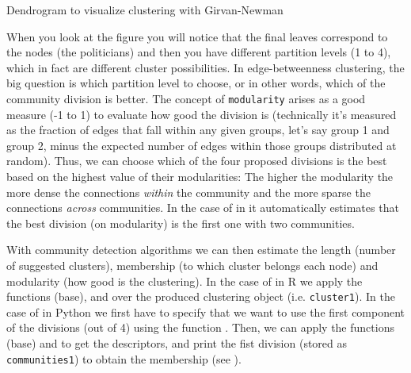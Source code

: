 \begin{ccsexample}
  \caption{Dendrogram to visualize clustering with Girvan-Newman}
  \label{ex:girvan}
\end{ccsexample}



When you look at the figure you will notice that the final leaves correspond to the nodes (the politicians) and then you have different partition levels (1 to 4), which in fact are different cluster possibilities. In edge-betweenness clustering, the big question is which partition level to choose, or in other words, which of the community division is better. The concept of \texttt{modularity} arises as a good measure (-1 to 1) to evaluate how good the division is (technically it's measured as the fraction of edges that fall within any given groups, let's say group 1 and group 2, minus the expected number of edges within those groups distributed at random). Thus, we can choose which of the four proposed divisions is the best based on the highest value of their modularities: The higher the modularity the more dense the connections \textit{within} the community and the more sparse the connections \textit{across} communities. In the case of  in  it automatically estimates that the best division (on modularity) is the first one with two communities.

With community detection algorithms we can then estimate the length (number of suggested clusters), membership (to which cluster belongs each node) and modularity (how good is the clustering). In the case of  in R we apply the functions  (base),  and  over the produced clustering object (i.e. \texttt{cluster1}). In the case of  in Python we first have to specify that we want to use the first component of the divisions (out of 4) using the function . Then, we can apply the functions  (base) and  to get the descriptors, and print the fist division (stored as \texttt{communities1}) to obtain the membership (see ).



